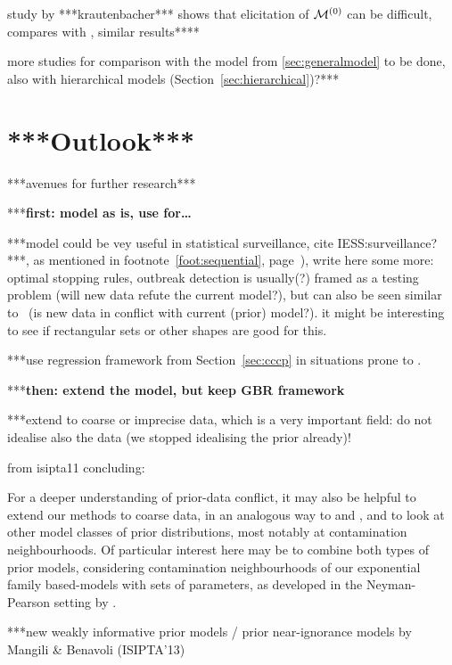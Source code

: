 study by ***krautenbacher*** shows that elicitation of $\mathcal{M}^{(0)}$ can be difficult,
compares with \textcite{2005:whitcomb}, similar results****

more studies for comparison with the model from \ref{sec:generalmodel} to be done,
also with hierarchical models (Section~\ref{sec:hierarchical})?***







\section{***Outlook***}

***avenues for further research***

***\textbf{first: model as is, use for\dots }

***model could be vey useful in statistical surveillance, cite IESS:surveillance?***,
as mentioned in footnote~\ref{foot:sequential}, page~\pageref{foot:sequential}),
write here some more: optimal stopping rules, outbreak detection is usually(?)
framed as a testing problem (will new data refute the current model?),
but can also be seen similar to \pdc\ (is new data in conflict with current (prior) model?).
it might be interesting to see if rectangular sets or other shapes are good for this.  

***use regression framework from Section~\ref{sec:cccp} in situations prone to \pdc.


***\textbf{then: extend the model, but keep GBR framework}

***extend to coarse or imprecise data, which is a very important field:
do not idealise also the data (we stopped idealising the prior already)!

from isipta11 concluding:
\begin{small}
For a deeper understanding of prior-data conflict, it may also be helpful
to extend our methods to coarse data, in an analogous way to \textcite{2007:utkinaugustin} and
\textcite{2009:Troffaes:Coolen}, and to look at other model classes of prior distributions, most
notably at contamination neighbourhoods. Of particular interest here may
be to combine both types of prior models, considering contamination
neighbourhoods of our exponential family based-models with sets of
parameters, as developed in the Neyman-Pearson setting by
\textcite[\S~5]{2002:augustin}.
\end{small}

***new weakly informative prior models / prior near-ignorance models by Mangili \& Benavoli (ISIPTA'13)


